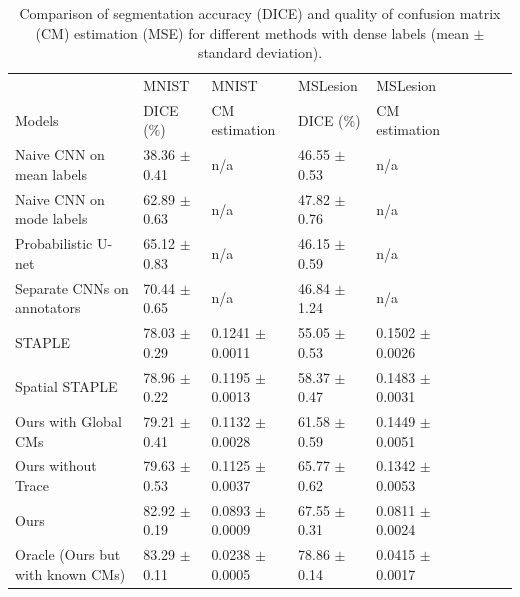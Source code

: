 \begin{table}[!h]
\vspace{-4mm}
	\center
	\footnotesize
	\begin{tabular}{@{}lllllllll}
		\hline
		 & MNIST & MNIST  & MSLesion  & MSLesion  \\
		Models & DICE (\%) & CM estimation & DICE (\%) & CM estimation \\
		\hline	
		Naive CNN on mean labels & 38.36 $\pm$ 0.41 &  n/a & 46.55 $\pm$ 0.53 &  n/a  \\
		Naive CNN on mode labels & 62.89 $\pm$ 0.63 &  n/a & 47.82 $\pm$ 0.76 &  n/a  \\
		Probabilistic U-net \cite{kohl2018probabilistic}  & 65.12 $\pm$ 0.83  &  n/a  & 46.15 $\pm$ 0.59  & n/a    \\
		Separate CNNs on annotators & 70.44 $\pm$ 0.65 & n/a & 46.84 $\pm$ 1.24 & n/a &   \\ 
		STAPLE \cite{warfield2004simultaneous}& 78.03 $\pm$ 0.29 &  0.1241 $\pm$ 0.0011 & 55.05 $\pm$ 0.53 &  0.1502 $\pm$ 0.0026 \\ 
		Spatial STAPLE \cite{asman2012formulating} & 78.96 $\pm$ 0.22 &  0.1195 $\pm$ 0.0013 & 58.37 $\pm$ 0.47 &  0.1483 $\pm$ 0.0031  \\
		Ours with Global CMs & 79.21 $\pm$ 0.41  & 0.1132 $\pm$ 0.0028 & 61.58 $\pm$ 0.59   &  0.1449 $\pm$ 0.0051   \\
		Ours without Trace & 79.63 $\pm$ 0.53  &  0.1125 $\pm$ 0.0037 & 65.77 $\pm$ 0.62 &  0.1342 $\pm$ 0.0053  \\
		Ours & 82.92 $\pm$ 0.19 &  0.0893 $\pm$ 0.0009 & 67.55 $\pm$ 0.31 &  0.0811 $\pm$ 0.0024    \\
		Oracle (Ours but with known CMs)   & 83.29 $\pm$ 0.11 & 0.0238 $\pm$ 0.0005 & 78.86 $\pm$ 0.14 &  0.0415 $\pm$ 0.0017   \\ 
		\hline
	\end{tabular}%
\caption{\footnotesize Comparison of segmentation accuracy (DICE) and quality of confusion matrix (CM) estimation (MSE) for different methods with dense labels (mean $\pm$ standard deviation).}
\label{denselabel of MNIST and MS}
\end{table}
\vspace{-4mm}
